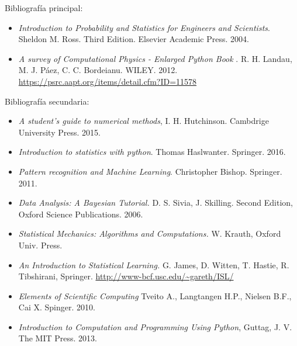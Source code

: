 \documentclass[letterpaper,10pt,onecolumn]{article}
\begin{document}
\noindent\normalsize Bibliograf\'ia principal:

\begin{itemize}

\item \textit{Introduction to Probability and Statistics for Engineers and
  Scientists}. Sheldon M. Ross. Third Edition. Elsevier Academic
  Press. 2004.

\item
\textit{A survey of Computational Physics - Enlarged Python Book}
. R. H. Landau, M. J. P\'aez, C. C. Bordeianu. WILEY. 2012.
\url{https://psrc.aapt.org/items/detail.cfm?ID=11578}




\end{itemize}

\noindent\normalsize Bibliograf\'ia secundaria:

\begin{itemize}

\item 
\textit{A student's guide to numerical methods},
I. H. Hutchinson. Cambdrige University Press. 2015.
\item
\textit{Introduction to statistics with python}.
Thomas Haslwanter.  Springer. 2016.

\item 
\textit{Pattern recognition and Machine Learning}.
Christopher Bishop. Springer. 2011.

\item
\textit{Data Analysis: A Bayesian Tutorial.} D. S. Sivia,
J. Skilling. Second Edition, Oxford Science Publications. 2006.

\item 
\textit{Statistical Mechanics: Algorithms and Computations.}
W. Krauth, Oxford Univ. Press. 

\item
\textit{An Introduction to Statistical Learning.} G. James, D. Witten,
T. Hastie, R. Tibshirani,
Springer. \url{http://www-bcf.usc.edu/~gareth/ISL/} 


\item
\textit{Elements of Scientific Computing}
Tveito A., Langtangen H.P., Nielsen B.F., Cai X. Spinger. 2010.

\item 
\textit{Introduction to Computation and Programming Using Python},
Guttag, J. V. The MIT Press. 2013.

\end{itemize}
\end{document}
